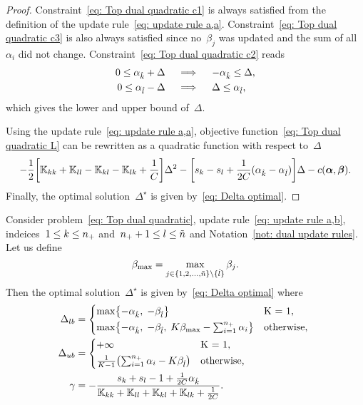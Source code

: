 \begin{proof}
  Constraint~\eqref{eq: Top dual quadratic c1} is always satisfied from the definition of the update rule~\eqref{eq: update rule a,a}. Constraint~\eqref{eq: Top dual quadratic c3} is also always satisfied since no~$\beta_j$ was updated and the sum of all~$\alpha_i$ did not change. Constraint~\eqref{eq: Top dual quadratic c2} reads
  \begin{align*}
    0 \leq \alpha_{\hat{k}} + \Delta
    & \quad \implies \quad
    - \alpha_{\hat{k}} \leq \Delta, \\
    0 \leq \alpha_{\hat{l}} - \Delta
    & \quad \implies \quad
    \Delta \leq \alpha_{\hat{l}},
  \end{align*}
  which gives the lower and upper bound of~$\Delta.$
  
  Using the update rule~\eqref{eq: update rule a,a}, objective function~\eqref{eq: Top dual quadratic L} can be rewritten as a quadratic function with respect to~$\Delta$
  \begin{equation*}
    - \frac{1}{2} \Brac[s]{\K_{kk} + \K_{ll} - \K_{kl} - \K_{lk} + \frac{1}{C}} \Delta^2
    - \Brac[s]{s_k - s_l + \frac{1}{2C}(\alphak - \alphal)} \Delta
    - c(\bm{\alpha}, \bm{\beta}).
  \end{equation*}
  Finally, the optimal solution~$\Delta^{\star}$ is given by~\eqref{eq: Delta optimal}.
\end{proof}

\begin{proposition}\label{prop: toppushk family quadratic update a,b}
  Consider problem~\eqref{eq: Top dual quadratic}, update rule~\eqref{eq: update rule a,b}, indeices~$1 \leq k \leq n_{+}$ and~$n_{+} + 1 \leq l \leq \tilde{n}$  and Notation~\ref{not: dual update rules}. Let us define
  \begin{equation*}
    \beta_{\max} = \max_{j \in \{1, 2, \ldots, \tilde{n} \} \setminus \{\hat{l}\}} \beta_j.
  \end{equation*}
  Then the optimal solution~$\Delta^{\star}$ is given by~\eqref{eq: Delta optimal} where
  \begin{align*}
    \Delta_{lb} & = 
      \begin{cases*}
        \max \Brac[c]{- \alphak,\;  -\betal} & K = 1, \\
        \max \Brac[c]{- \alphak,\;  -\betal, \; K\beta_{\max} - \sum_{i = 1}^{\npos} \alpha_i} & \textrm{otherwise},
      \end{cases*} \\
    \Delta_{ub} & = 
      \begin{cases*}
        + \infty & K = 1, \\
        \frac{1}{K-1}\Brac{\sum_{i = 1}^{\npos} \alpha_i - K \betal} & \textrm{otherwise},
      \end{cases*} \\
    \gamma & = -\frac{s_k + s_l - 1 + \frac{1}{2C} \alphak}{\K_{kk} + \K_{ll} + \K_{kl} + \K_{lk} + \frac{1}{2C}}.
  \end{align*}
\end{proposition}


